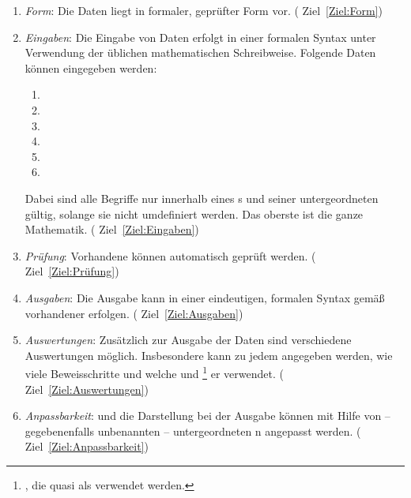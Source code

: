 \begin{enumerate}

	\item \label{Anforderung:Form} \emph{Form}:
	Die Daten liegt in formaler, geprüfter Form vor.
	(\seename{} Ziel~\vref{Ziel:Form})

	\item \label{Anforderung:Eingaben} \emph{Eingaben}:
	Die Eingabe von Daten erfolgt in einer formalen Syntax
	unter Verwendung der üblichen mathematischen Schreibweise.
	Folgende Daten können eingegeben werden:
	\begin{enumerate}
		\item {}
		\item {}
		\item {}
		\item {}
		\item {}
		\item {}
	\end{enumerate}
	Dabei sind alle Begriffe nur innerhalb eines s
	und seiner untergeordneten  gültig,
	solange sie nicht umdefiniert werden.
	Das oberste  ist die ganze Mathematik.
	(\seename{} Ziel~\vref{Ziel:Eingaben})

	\item \label{Anforderung:Prüfung} \emph{Prüfung}:
	Vorhandene  können automatisch geprüft werden.
	(\seename{} Ziel~\vref{Ziel:Prüfung})

	\item \label{Anforderung:Ausgaben} \emph{Ausgaben}:
	Die Ausgabe kann in einer eindeutigen, formalen Syntax
	gemäß vorhandener  erfolgen.
	(\seename{} Ziel~\vref{Ziel:Ausgaben})

	\item \label{Anforderung:Auswertungen} \emph{Auswertungen}:
	Zusätzlich zur Ausgabe der Daten sind verschiedene Auswertungen möglich.
	Insbesondere kann zu jedem  angegeben werden,
	wie viele Beweisschritte und welche  und %
	\footnote{, die quasi als  verwendet werden.}
	er verwendet.
	(\seename{} Ziel~\vref{Ziel:Auswertungen})

	\item \label{Anforderung:Anpassbarkeit} \emph{Anpassbarkeit}:
	und die Darstellung bei der Ausgabe können mit Hilfe von
	-- gegebenenfalls unbenannten --
	untergeordneten n angepasst werden.
	(\seename{} Ziel~\vref{Ziel:Anpassbarkeit})


\end{enumerate}
